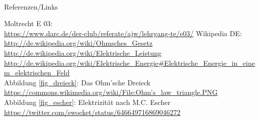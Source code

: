 \renewcommand{\refname}{Referenzen}

\hypertarget{refs}{}
\textcolor{white}{} \\ %
\Large Referenzen/Links
\footnotesize

\begin{thebibliography}{}
     Moltrecht E 03: \\
    \url{https://www.darc.de/der-club/referate/ajw/lehrgang-te/e03/}
      Wikipedia DE: \\
    \url{http://de.wikipedia.org/wiki/Ohmsches_Gesetz}\\
    \url{http://de.wikipedia.org/wiki/Elektrische_Leistung}\\
    \url{http://de.wikipedia.org/wiki/Elektrische_Energie#Elektrische_Energie_in_einem_elektrischen_Feld}\\
    
      Abbildung \ref{fig_dreieck}: Das Ohm'sche Dreieck\\
	    \url{https://commons.wikimedia.org/wiki/File:Ohm's_law_triangle.PNG}\\
	  Abbildung \ref{fig_escher}: Elektrizität nach M.C. Escher\\
		\url{https://twitter.com/swocket/status/646649716869046272}\\
\end{thebibliography}


